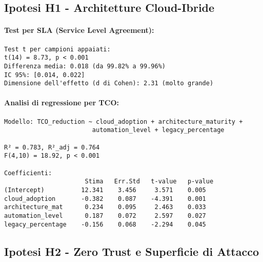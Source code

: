 \subsection{\texorpdfstring{Ipotesi H1 - Architetture Cloud-Ibride}{B.2.1 - Ipotesi H1 - Architetture Cloud-Ibride}}

\paragraph{Test per SLA (Service Level Agreement):}
\begin{lstlisting}[basicstyle=\small\ttfamily]
Test t per campioni appaiati:
t(14) = 8.73, p < 0.001
Differenza media: 0.018 (da 99.82% a 99.96%)
IC 95%: [0.014, 0.022]
Dimensione dell'effetto (d di Cohen): 2.31 (molto grande)
\end{lstlisting}

\paragraph{Analisi di regressione per TCO:}
\begin{lstlisting}[basicstyle=\small\ttfamily]
Modello: TCO_reduction ~ cloud_adoption + architecture_maturity + 
                        automation_level + legacy_percentage

R² = 0.783, R²_adj = 0.764
F(4,10) = 18.92, p < 0.001

Coefficienti:
                      Stima   Err.Std   t-value   p-value
(Intercept)          12.341    3.456     3.571    0.005
cloud_adoption       -0.382    0.087    -4.391    0.001
architecture_mat      0.234    0.095     2.463    0.033
automation_level      0.187    0.072     2.597    0.027
legacy_percentage    -0.156    0.068    -2.294    0.045
\end{lstlisting}

\subsection{\texorpdfstring{Ipotesi H2 - Zero Trust e Superficie di Attacco}{B.2.2 - Ipotesi H2 - Zero Trust e Superficie di Attacco}}

